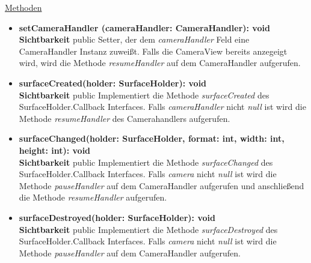 \underline{Methoden}
\begin{itemize}
\itemsep0pt

\item \textbf{setCameraHandler (cameraHandler: CameraHandler): void}\hfill\\
\textbf{Sichtbarkeit} public\newline
Setter, der dem \textit{cameraHandler} Feld eine CameraHandler Instanz zuweißt. Falls die CameraView bereits anzegeigt wird, wird die Methode \textit{resumeHandler} auf dem CameraHandler aufgerufen.

\item \textbf{surfaceCreated(holder: SurfaceHolder): void}\hfill\\
\textbf{Sichtbarkeit} public\newline
Implementiert die Methode \textit{surfaceCreated} des SurfaceHolder.Callback Interfaces. Falls \textit{cameraHandler} nicht \textit{null} ist wird die Methode \textit{resumeHandler} des Camerahandlers aufgerufen.

\item \textbf{surfaceChanged(holder: SurfaceHolder, format: int, width: int, height: int): void}\hfill\\
\textbf{Sichtbarkeit} public\newline
Implementiert die Methode \textit{surfaceChanged} des SurfaceHolder.Callback Interfaces. Falls \textit{camera} nicht \textit{null} ist wird die Methode \textit{pauseHandler} auf dem CameraHandler aufgerufen und anschließend die Methode \textit{resumeHandler} aufgerufen.

\item \textbf{surfaceDestroyed(holder: SurfaceHolder): void}\hfill\\
\textbf{Sichtbarkeit} public\newline
Implementiert die Methode \textit{surfaceDestroyed} des SurfaceHolder.Callback Interfaces. Falls \textit{camera} nicht \textit{null} ist wird die Methode \textit{pauseHandler} auf dem CameraHandler aufgerufen.

\end{itemize}